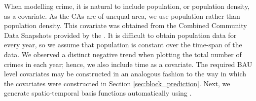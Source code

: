 \documentclass[article]{jss}
\newcommand{\class}[1]{`\code{#1}'}
\newcommand{\fct}[1]{\code{#1()}}
\begin{document}
When modelling crime, it is natural to include population, or population density, as a covariate. 
As the CAs are of unequal area, we use population rather than population density.
This covariate was obtained from the Combined Community Data Snapshots provided by the \cite{Chicago_community_data_snapshots}.
It is difficult to obtain population data for every year, so we assume that population is constant over the time-span of the data.
 We observed a distinct negative trend when plotting the total number of crimes in each year; hence, we also include time as a covariate.
The required BAU level covariates may be constructed in an analogous fashion to 
the way in which the covariates were constructed in 
Section \ref{sec:block_prediction}. 
%
Next, we generate spatio-temporal basis functions automatically using \fct{auto\_basis}.  
\end{document}
